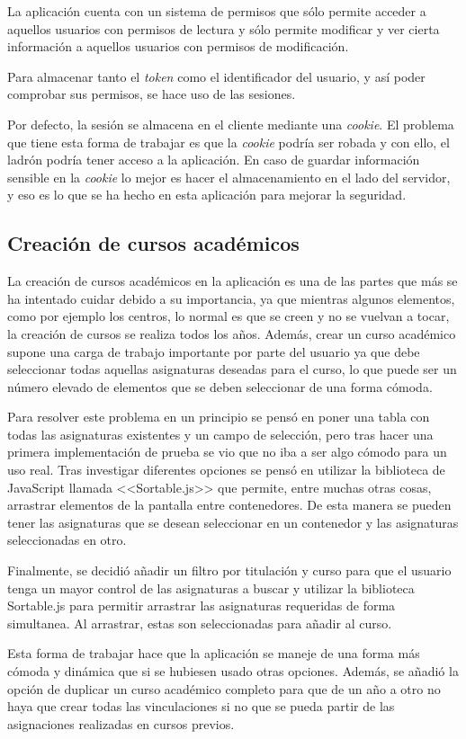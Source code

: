 La aplicación cuenta con un sistema de permisos que sólo permite acceder a aquellos usuarios con permisos de lectura y sólo permite modificar y ver cierta información a aquellos usuarios con permisos de modificación.

Para almacenar tanto el \textit{token} como el identificador del usuario, y así poder comprobar sus permisos, se hace uso de las sesiones.

Por defecto, la sesión se almacena en el cliente mediante una \textit{cookie}. 
El problema que tiene esta forma de trabajar es que la \textit{cookie} podría ser robada y con ello, el ladrón podría tener acceso a la aplicación. 
En caso de guardar información sensible en la \textit{cookie} lo mejor es hacer el almacenamiento en el lado del servidor, y eso es lo que se ha hecho en esta aplicación para mejorar la seguridad.

\subsection{Creación de cursos académicos}
La creación de cursos académicos en la aplicación es una de las partes que más se ha intentado cuidar debido a su importancia, ya que mientras algunos elementos, como por ejemplo los centros, lo normal es que se creen y no se vuelvan a tocar, la creación de cursos se realiza todos los años.
Además, crear un curso académico supone una carga de trabajo importante por parte del usuario ya que debe seleccionar todas aquellas asignaturas deseadas para el curso, lo que puede ser un número elevado de elementos que se deben seleccionar de una forma cómoda.

Para resolver este problema en un principio se pensó en poner una tabla con todas las asignaturas existentes y un campo de selección, pero tras hacer una primera implementación de prueba se vio que no iba a ser algo cómodo para un uso real.
Tras investigar diferentes opciones se pensó en utilizar la biblioteca de JavaScript llamada <<Sortable.js>> que permite, entre muchas otras cosas, arrastrar elementos de la pantalla entre contenedores.
De esta manera se pueden tener las asignaturas que se desean seleccionar en un contenedor y las asignaturas seleccionadas en otro.

Finalmente, se decidió añadir un filtro por titulación y curso para que el usuario tenga un mayor control de las asignaturas a buscar y utilizar la biblioteca Sortable.js para permitir arrastrar las asignaturas requeridas de forma simultanea.
Al arrastrar, estas son seleccionadas para añadir al curso.

Esta forma de trabajar hace que la aplicación se maneje de una forma más cómoda y dinámica que si se hubiesen usado otras opciones.
Además, se añadió la opción de duplicar un curso académico completo para que de un año a otro no haya que crear todas las vinculaciones si no que se pueda partir de las asignaciones realizadas en cursos previos.




